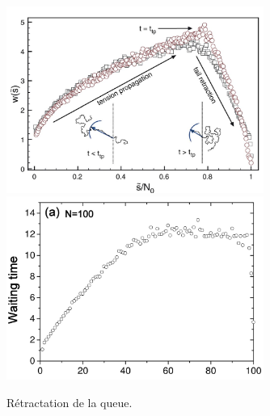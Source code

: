 \documentclass[a4paper,11pt]{article}
\begin{document}
 \begin{figure}[H]
\begin{center}
\includegraphics[width=0.75\textwidth]{tailretractinpore.jpg}
\includegraphics[width=0.75\textwidth]{tailretractpulling.jpg} 

\caption{Rétractation de la queue.}
\label{regimeprofiles}
\end{center}
\end{figure}
\end{document}
